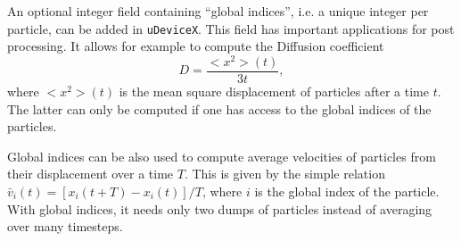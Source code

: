 An optional integer field containing ``global indices'', i.e. a unique integer per particle, can be added in \texttt{uDeviceX}. This field has important applications for post processing. It allows for example to compute the Diffusion coefficient
\[
D = \frac{<x^2>(t)}{3 t},
\]
where $<x^2>(t)$ is the mean square displacement of particles after a time $t$. The latter can only be computed if one has access to the global indices of the particles.

Global indices can be also used to compute average velocities of particles from their displacement over a time $T$. This is given by the simple relation $\bar{v}_i(t) = [x_i(t + T) - x_i(t)] / T$, where $i$ is the global index of the particle. With global indices, it needs only two dumps of particles instead of averaging over many timesteps.

